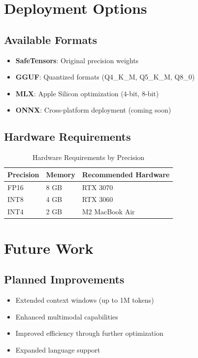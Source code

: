 \documentclass[11pt,a4paper]{article}
\begin{document}
\section{Deployment Options}

\subsection{Available Formats}
\begin{itemize}
    \item \textbf{SafeTensors}: Original precision weights
    \item \textbf{GGUF}: Quantized formats (Q4\_K\_M, Q5\_K\_M, Q8\_0)
    \item \textbf{MLX}: Apple Silicon optimization (4-bit, 8-bit)
    \item \textbf{ONNX}: Cross-platform deployment (coming soon)
\end{itemize}

\subsection{Hardware Requirements}
\begin{table}[H]
\centering
\begin{tabular}{lll}
\toprule
\textbf{Precision} & \textbf{Memory} & \textbf{Recommended Hardware} \\
\midrule
FP16 & 8 GB & RTX 3070 \\
INT8 & 4 GB & RTX 3060 \\
INT4 & 2 GB & M2 MacBook Air \\
\bottomrule
\end{tabular}
\caption{Hardware Requirements by Precision}
\end{table}

\section{Future Work}

\subsection{Planned Improvements}
\begin{itemize}
    \item Extended context windows (up to 1M tokens)
    \item Enhanced multimodal capabilities
    \item Improved efficiency through further optimization
    \item Expanded language support
\end{itemize}
\end{document}

